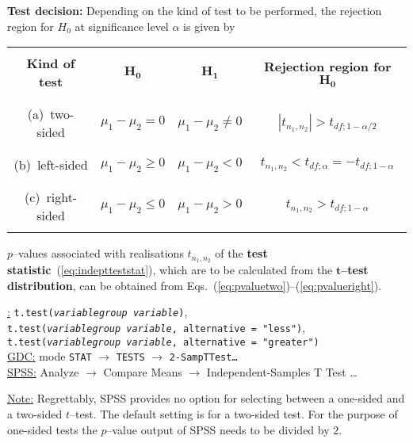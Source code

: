 \medskip
\noindent
\textbf{Test decision:} Depending on the kind of test to be 
performed, the rejection region for $H_{0}$ at significance level 
$\alpha$ is given by
%
\begin{center}
\begin{tabular}[h!]{c|c|c|c}
 & & & \\
\textbf{Kind of test} & $\boldsymbol{H_{0}}$ &
$\boldsymbol{H_{1}}$ &
\textbf{Rejection region for} $\boldsymbol{H_{0}}$ \\
 & & & \\
\hline
 & & & \\
(a)~two-sided & $\mu_{1}-\mu_{2}=0$ & $\mu_{1}-\mu_{2}\neq 0$ &
$|t_{n_{1},n_{2}}|>t_{df;1-\alpha/2}$ \\
 & & & \\
\hline
 & & & \\
(b)~left-sided & $\mu_{1}-\mu_{2}\geq 0$ & $\mu_{1}-\mu_{2}<0$ &
$t_{n_{1},n_{2}}<t_{df;\alpha}=-t_{df;1-\alpha}$ \\
 & & & \\
\hline
 & & & \\
(c)~right-sided & $\mu_{1}-\mu_{2}\leq 0$ & $\mu_{1}-\mu_{2}>0$ &
$t_{n_{1},n_{2}}>t_{df;1-\alpha}$ \\
 & & &
\end{tabular}
\end{center}
%
$p$--values associated with realisations $t_{n_{1},n_{2}}$ of the
\textbf{test statistic}~(\ref{eq:indeptteststat}), which are to be
calculated from the
$\boldsymbol{t}$\textbf{--test distribution}, can be obtained from 
Eqs.~(\ref{eq:pvaluetwo})--(\ref{eq:pvalueright}).

\medskip
\noindent
\underline{\R:}
\texttt{t.test(\textit{variable}\texttildelow\textit{group
variable})}, \\
\texttt{t.test(\textit{variable}\texttildelow\textit{group
variable}, alternative = "less")}, \\
\texttt{t.test(\textit{variable}\texttildelow\textit{group
variable}, alternative = "greater")} \\
\underline{GDC:} mode \texttt{STAT} $\rightarrow$ \texttt{TESTS}
$\rightarrow$ \texttt{2-SampTTest\ldots} \\
\underline{SPSS:} Analyze $\rightarrow$ Compare Means
$\rightarrow$ Independent-Samples T Test \ldots

\medskip
\noindent
\underline{Note:} Regrettably, SPSS provides no option for 
selecting between a one-sided and a two-sided $t$--test. The 
default setting is for a two-sided test. For the purpose of 
one-sided tests the $p$--value output of SPSS needs to be divided 
by $2$.


